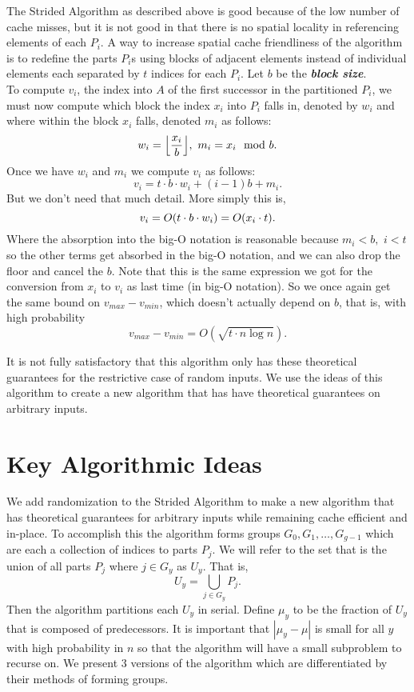 \documentclass[twocolumn, twoside, 12pt]{article}
\DeclarePairedDelimiter{\floor}{\lfloor}{\rfloor}
\DeclarePairedDelimiter{\paren}{(}{)}
\newcommand{\defn}[1]       {{\textit{\textbf{\boldmath #1}}}}
\renewcommand{\paragraph}[1]{\vspace{0.09in}\noindent{\bf \boldmath #1.}}
\begin{document}
\paragraph{Spatial locality}
The Strided Algorithm as described above is good because of the low number of cache misses, but it is not good in that there is no spatial locality in referencing elements of each $P_i$.
A way to increase spatial cache friendliness of the algorithm is to redefine the parts $P_i$s using blocks of adjacent elements instead of individual elements each separated by $t$ indices for each $P_i$.
Let $b$ be the \defn{block size}. \\
To compute $v_i$, the index into $A$ of the first successor in the partitioned $P_i$, we must now compute which block the index $x_i$ into $P_i$ falls in, denoted by $w_i$ and where within the block $x_i$ falls, denoted $m_i$ as follows:
$$w_i = \floor*{ \frac{x_i}{b} },\,\, m_i=x_i \mod b.$$
Once we have $w_i$ and $m_i$ we compute $v_i$ as follows:
$$v_i = t\cdot b\cdot w_i + (i-1)b+m_i.$$
But we don't need that much detail.
More simply this is, 
$$v_i = O(t\cdot b \cdot w_i) = O\paren*{x_i\cdot t}.$$
Where the absorption into the big-O notation is reasonable because $m_i < b,\,\, i<t$ so the other terms get absorbed in the big-O notation, and we can also drop the floor and cancel the $b$. 
Note that this is the same expression we got for the conversion from $x_i$ to $v_i$ as last time (in big-O notation).
So we once again get the same bound on $v_{max}-v_{min}$, which doesn't actually depend on $b$, that is, with high probability
$$v_{max}-v_{min} = O(\sqrt{t\cdot n\log n}).$$

\paragraph{Summary}
It is not fully satisfactory that this algorithm only has these theoretical guarantees for the restrictive case of random inputs.
We use the ideas of this algorithm to create a new algorithm that has have theoretical guarantees on arbitrary inputs.

\section{Key Algorithmic Ideas}
We add randomization to the Strided Algorithm to make a new algorithm that has theoretical guarantees for arbitrary inputs while remaining cache efficient and in-place.
To accomplish this the algorithm forms groups $G_0,G_1,\ldots,G_{g-1}$ which are each a collection of indices to parts $P_j$. 
We will refer to the set that is the union of all parts $P_j$ where $j \in G_y$ as $U_y$. That is,
$$U_y = \bigcup_{j\in G_y}P_j.$$
Then the algorithm partitions each $U_y$ in serial.
Define $\mu_y$ to be the fraction of $U_y$ that is composed of predecessors.
It is important that $|\mu_y - \mu|$ is small for all $y$ with high probability in $n$ so that the algorithm will have a small subproblem to recurse on.
We present 3 versions of the algorithm which are differentiated by their methods of forming groups.
\end{document}
